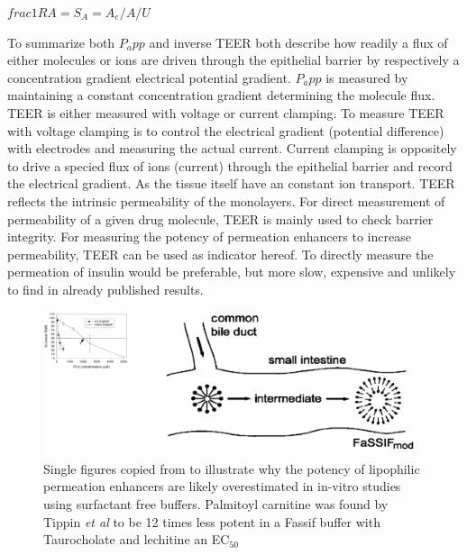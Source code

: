 $frac{1}{RA} = S_A = A_e/A / U \quad$

To summarize both $P_app$ and inverse TEER both describe how readily a flux of either molecules or ions are driven through the epithelial barrier by respectively a concentration gradient electrical potential gradient. $P_app$ is measured by maintaining a constant concentration gradient determining the molecule flux. TEER is either measured with voltage or current clamping. To measure TEER with voltage clamping is to control the electrical gradient (potential difference) with electrodes and measuring the actual current. Current clamping is oppositely to drive a specied flux of ions (current) through the epithelial barrier and record the electrical gradient. As the tissue itself have an constant ion transport. TEER reflects the intrinsic permeability of the monolayers. For direct measurement of permeability of a given drug molecule, TEER is mainly used to check barrier integrity. For measuring the potency of permeation enhancers to increase permeability, TEER can be used as indicator hereof. To directly measure the permeation of insulin would be preferable, but more slow, expensive and unlikely to find in already published results.

\begin{figure}[h]
\label{devel_fassif}
\includegraphics{graphics/devel_Fasssif_PCC2.png}
\caption{Single figures copied from \cite{tippin2008biorelevant,nawroth2011liposome} to illustrate why the potency of lipophilic permeation enhancers are likely overestimated in in-vitro studies using surfactant free buffers. Palmitoyl carnitine was found by Tippin \textit{et al} to be 12 times less potent in a Fassif buffer with Taurocholate and lechitine an EC$_{50}$}
\end{figure}


